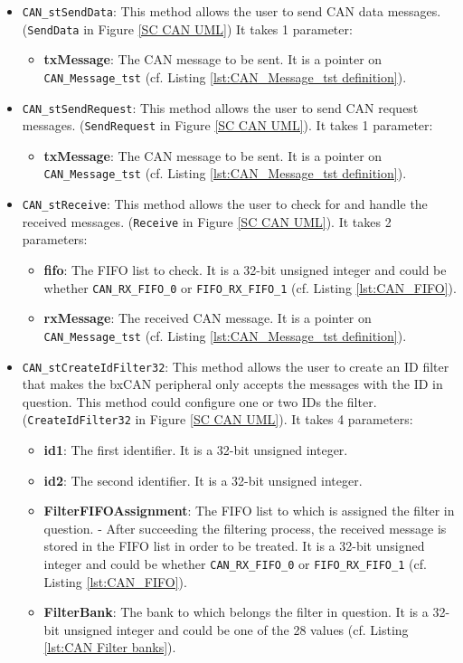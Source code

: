 \begin{itemize}
    \item \verb|CAN_stSendData|: This method allows the user to send CAN data messages. (\texttt{SendData} in Figure \ref{SC CAN UML}) It takes 1 parameter:
    \begin{itemize}
        \item \textbf{txMessage}: The CAN message to be sent. It is a pointer on \texttt{CAN\_Message\_tst} (cf. Listing \ref{lst:CAN_Message_tst definition}).
    \end{itemize}

    \item \verb|CAN_stSendRequest|: This method allows the user to send CAN request messages. (\texttt{SendRequest} in Figure \ref{SC CAN UML}). It takes 1 parameter:
    \begin{itemize}
        \item \textbf{txMessage}: The CAN message to be sent. It is a pointer on \texttt{CAN\_Message\_tst} (cf. Listing \ref{lst:CAN_Message_tst definition}).
    \end{itemize}

    \item \verb|CAN_stReceive|: This method allows the user to check for and handle the received messages. (\texttt{Receive} in Figure \ref{SC CAN UML}). It takes 2 parameters:
    \begin{itemize}
        \item \textbf{fifo}: The FIFO list to check. It is a 32-bit unsigned integer and could be whether \texttt{CAN\_RX\_FIFO\_0} or \texttt{FIFO\_RX\_FIFO\_1} (cf. Listing \ref{lst:CAN_FIFO}).
        \item \textbf{rxMessage}: The received CAN message. It is a pointer on \texttt{CAN\_Message\_tst} (cf. Listing \ref{lst:CAN_Message_tst definition}). 
    \end{itemize}

    \item \verb|CAN_stCreateIdFilter32|: This method allows the user to create an ID filter that makes the bxCAN peripheral only accepts the messages with the ID in question. This method could configure one or two IDs the filter. (\texttt{CreateIdFilter32} in Figure \ref{SC CAN UML}). It takes 4 parameters:
    \begin{itemize}
        \item \textbf{id1}: The first identifier. It is a 32-bit unsigned integer.
        \item \textbf{id2}: The second identifier. It is a 32-bit unsigned integer.
        \item \textbf{FilterFIFOAssignment}: The FIFO list to which is assigned the filter in question. - After succeeding the filtering process, the received message is stored in the FIFO list in order to be treated. It is a 32-bit unsigned integer and could be whether \texttt{CAN\_RX\_FIFO\_0} or \texttt{FIFO\_RX\_FIFO\_1} (cf. Listing \ref{lst:CAN_FIFO}).
        \item \textbf{FilterBank}: The bank to which belongs the filter in question. It is a 32-bit unsigned integer and could be one of the 28 values (cf. Listing \ref{lst:CAN Filter banks}).
    \end{itemize}


\end{itemize}
